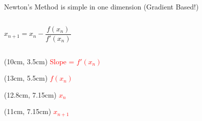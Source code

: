 \documentclass[aspectratio=169, usenames,dvipsnames, 14pt]{beamer}
\begin{document}
\begin{frame}{\small Newton’s Method is simple in one dimension (Gradient Based!)}
    \begin{columns}
                $$ x_{n+1} = x_{n} - \dfrac{f(x_{n})}{f'(x_{n})} $$                    %

        
    \end{columns}
    
    \begin{textblock*}{3cm}(10cm, 3.5cm)
        \small \textcolor{red}{Slope = $f'(x_{n})$}
    \end{textblock*}
    
    \begin{textblock*}{3cm}(13cm, 5.5cm)
        \small \textcolor{red}{$f(x_{n})$}
    \end{textblock*}
    
    \begin{textblock*}{3cm}(12.8cm, 7.15cm)
        \small \textcolor{red}{$x_{n}$}
    \end{textblock*}
    
    \begin{textblock*}{3cm}(11cm, 7.15cm)
        \small \textcolor{red}{$x_{n+1}$}
    \end{textblock*}
\end{frame}

\end{document}
